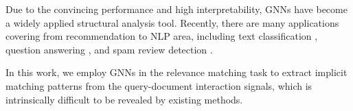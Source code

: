 Due to the convincing performance and high interpretability, GNNs have become a widely applied structural analysis tool. Recently, there are many applications covering from recommendation \cite{wu2019session,li2019fi} to NLP area, including text classification \cite{yao2019graph,zhang2020every}, question answering \cite{de2019question}, and spam review detection \cite{li2019spam}.

In this work, we employ GNNs in the relevance matching task to extract implicit matching patterns from the query-document interaction signals, which is intrinsically difficult to be revealed by existing methods. 

